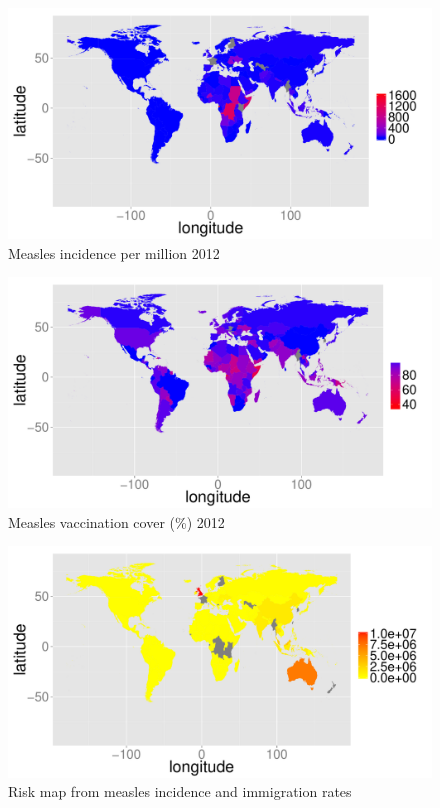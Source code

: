 \documentclass{article}
\begin{document}
\begin{figure}[h!]
\begin{center}
\includegraphics{interimreport1-008}
\end{center}
\caption{Measles incidence per million 2012}
\label{fig:incidence12}
\end{figure}

\begin{figure}[h!]
\begin{center}
\includegraphics{interimreport1-009}
\end{center}
\caption{Measles vaccination cover (\%) 2012 }
\label{fig:cover12}
\end{figure}

\begin{figure}[h!]
\begin{center}
\includegraphics{interimreport1-010}
\end{center}
\caption{Risk map from measles incidence and immigration rates}
\label{fig:risk12}
\end{figure}
\end{document}
